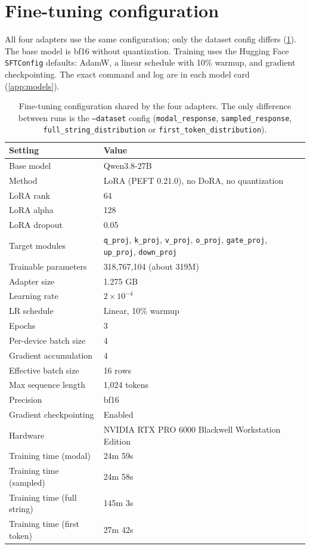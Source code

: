 \section{Fine-tuning configuration}
\label{sec:fine-tuning-config}

All four adapters use the same configuration; only the dataset config
differs (\ref{tab:finetuning-config}). The base model is bf16 without
quantization. Training uses the Hugging Face \texttt{SFTConfig} defaults:
AdamW, a linear schedule with 10\% warmup, and gradient checkpointing. The
exact command and log are in each model card (\ref{app:models}).

\begin{table}[htbp]
  \centering
  \small
  \caption{Fine-tuning configuration shared by the four adapters. The only
  difference between runs is the \texttt{--dataset} config
  (\texttt{modal\_response}, \texttt{sampled\_response},
  \texttt{full\_string\_distribution} or
  \texttt{first\_token\_distribution}).}
  \label{tab:finetuning-config}
  \begin{tabular}{@{}l p{}@{}}
    \toprule
    Setting & Value \\
    \midrule
    Base model & Qwen3.8-27B \\
    Method & LoRA (PEFT 0.21.0), no DoRA, no quantization \\
    LoRA rank & 64 \\
    LoRA alpha & 128 \\
    LoRA dropout & 0.05 \\
    Target modules & \texttt{q\_proj}, \texttt{k\_proj}, \texttt{v\_proj},
      \texttt{o\_proj}, \texttt{gate\_proj}, \texttt{up\_proj},
      \texttt{down\_proj} \\
    Trainable parameters & 318,767,104 (about 319M) \\
    Adapter size & 1.275 GB \\
    Learning rate & $2 \times 10^{-4}$ \\
    LR schedule & Linear, 10\% warmup \\
    Epochs & 3 \\
    Per-device batch size & 4 \\
    Gradient accumulation & 4 \\
    Effective batch size & 16 rows \\
    Max sequence length & 1,024 tokens \\
    Precision & bf16 \\
    Gradient checkpointing & Enabled \\
    Hardware & NVIDIA RTX PRO 6000 Blackwell Workstation Edition \\
    Training time (modal) & 24m 59s \\
    Training time (sampled) & 24m 58s \\
    Training time (full string) & 145m 3s \\
    Training time (first token) & 27m 42s \\
    \bottomrule
  \end{tabular}
\end{table}

